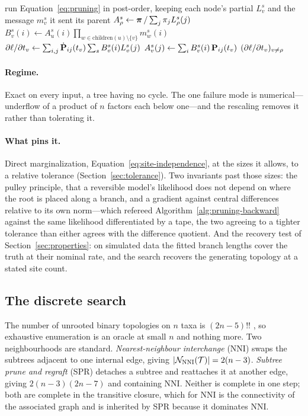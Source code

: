 \documentclass[11pt,a4paper]{article}
\begin{document}
\begin{algorithm}[htbp]
\caption{Two-pass gradient of the pruning recursion in the branch lengths}
\label{alg:pruning-backward}
\begin{algorithmic}[1]
\State run Equation~\ref{eq:pruning} in post-order, keeping each node's
       partial $L^s_v$ and the message $m^s_v$ it sent its parent
\State $A^s_{\rho} \gets \boldsymbol{\pi} \,/ \sum_{j} \pi_j L^s_{\rho}(j)$
  \State $B^s_v(i) \gets A^s_u(i) \prod_{w \in \mathrm{children}(u) \setminus \{v\}} m^s_w(i)$
  \State $\partial \ell / \partial t_v \gets \sum_{i,j} \dot{\mathbf{P}}_{ij}(t_v) \sum_s B^s_v(i) L^s_v(j)$
  \State $A^s_v(j) \gets \sum_i B^s_v(i)\, \mathbf{P}_{ij}(t_v)$
\EndFor
\State \Return $(\partial \ell / \partial t_v)_{v \neq \rho}$
\end{algorithmic}
\end{algorithm}

\paragraph{Regime.}
Exact on every input, a tree having no cycle. The one failure mode is
numerical---underflow of a product of $n$ factors each below one---and the
rescaling removes it rather than tolerating it.

\paragraph{What pins it.}
Direct marginalization, Equation~\ref{eq:site-independence}, at the sizes it
allows, to a relative tolerance (Section~\ref{sec:tolerance}). Two invariants
past those sizes: the pulley principle, that a reversible model's likelihood
does not depend on where the root is placed along a branch, and a gradient
against central differences relative to its own norm---which refereed
Algorithm~\ref{alg:pruning-backward} against the same likelihood differentiated
by a tape, the two agreeing to a tighter tolerance than either agrees with the
difference quotient. And the recovery test of Section~\ref{sec:properties}: on
simulated data the fitted branch lengths cover the truth at their nominal rate,
and the search recovers the generating topology at a stated site count.

\subsection{The discrete search}
\label{sec:phylo:search}
The number of unrooted binary topologies on $n$ taxa is $(2n-5)!!$
\citep{rosen2019}, so exhaustive enumeration is an oracle at small $n$ and
nothing more. Two neighbourhoods are standard. \emph{Nearest-neighbour
interchange} (NNI) swaps the subtrees adjacent to one internal edge, giving
$|\mathcal{N}_{\mathrm{NNI}}(\mathcal{T})| = 2(n-3)$. \emph{Subtree prune and
regraft} (SPR) detaches a subtree and reattaches it at another edge, giving
$2(n-3)(2n-7)$ and containing NNI. Neither is complete in one step; both are
complete in the transitive closure, which for NNI is the connectivity of the
associated graph \citep{felsenstein2004} and is inherited by SPR because it
dominates NNI.
\end{document}
